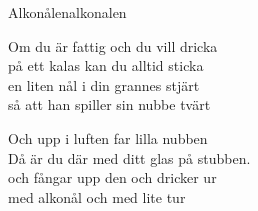 \begin{song}{Alkonålen}{alkonalen}
\begin{vers}
Om du är fattig och du vill dricka\\
på ett kalas kan du alltid sticka\\
en liten nål i din grannes stjärt\\
så att han spiller sin nubbe tvärt\\
\end{vers}
\begin{vers}
Och upp i luften far lilla nubben\\
Då är du där med ditt glas på stubben.\\
och fångar upp den och dricker ur\\
med alkonål och med lite tur\\
\end{vers}
\end{song}
